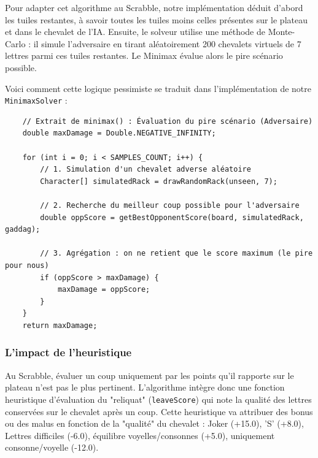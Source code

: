 \documentclass[a4paper]{article}
\begin{document}
    Pour adapter cet algorithme au Scrabble, notre implémentation déduit d'abord les tuiles restantes, à savoir toutes les tuiles moins celles présentes sur le plateau et dans le chevalet de l'IA. Ensuite, le solveur utilise une méthode de Monte-Carlo\cite{harrison2010introduction} : il simule l'adversaire en tirant aléatoirement 200 chevalets virtuels de 7 lettres parmi ces tuiles restantes. Le Minimax évalue alors le pire scénario possible.

    Voici comment cette logique pessimiste se traduit dans l'implémentation de notre \texttt{MinimaxSolver} :

    \begin{verbatim}
    // Extrait de minimax() : Évaluation du pire scénario (Adversaire)
    double maxDamage = Double.NEGATIVE_INFINITY;

    for (int i = 0; i < SAMPLES_COUNT; i++) {
        // 1. Simulation d'un chevalet adverse aléatoire
        Character[] simulatedRack = drawRandomRack(unseen, 7);

        // 2. Recherche du meilleur coup possible pour l'adversaire
        double oppScore = getBestOpponentScore(board, simulatedRack, gaddag);

        // 3. Agrégation : on ne retient que le score maximum (le pire pour nous)
        if (oppScore > maxDamage) {
            maxDamage = oppScore;
        }
    }
    return maxDamage;
    \end{verbatim}

    \subsubsection{L'impact de l'heuristique}
    Au Scrabble, évaluer un coup uniquement par les points qu'il rapporte sur le plateau n'est pas le plus pertinent. L'algorithme intègre donc une fonction heuristique d'évaluation du "reliquat" (\texttt{leaveScore}) qui note la qualité des lettres conservées sur le chevalet après un coup. Cette heuristique va attribuer des bonus ou des malus en fonction de la "qualité" du chevalet : Joker (+15.0), 'S' (+8.0), Lettres difficiles (-6.0), équilibre voyelles/consonnes (+5.0), uniquement consonne/voyelle (-12.0).
\end{document}
